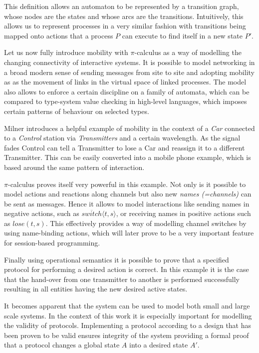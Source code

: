 This definition allows an automaton to be represented by a transition graph, whose nodes are the states and whose arcs are the transitions. Intuitively, this allows us to represent processes in a very similar fashion with transitions being mapped onto actions that a process $P$ can execute to find itself in a new state $P'$.

Let us now fully introduce mobility with $\pi$-calculus as a way of modelling the changing connectivity of interactive systems. It is possible to model networking in a broad modern sense of sending messages from site to site and adopting mobility as as the movement of links in the virtual space of linked processes. The model also allows to enforce a certain discipline on a family of automata, which can be compared to type-system value checking in high-level languages, which imposes certain patterns of behaviour on selected types.

Milner\cite{pi-calculus} introduces a helpful example of mobility in the context of a \textit{Car} connected to a \textit{Control} station via \textit{Transmitters} and a certain wavelength. As the signal fades Control can tell a Transmitter to lose a Car and reassign it to a different Transmitter. This can be easily converted into a mobile phone example, which is based around the same pattern of interaction.

$\pi$-calculus proves itself very powerful in this example. Not only is it possible to model actions and reactions along channels but also new \textit{names (=channels)} can be sent as messages. Hence it allows to model interactions like sending names in negative actions, such as $\overline{switch}\langle t,s \rangle$, or receiving names in positive actions such as $lose(t,s)$. This effectively provides a way of modelling channel switches by using name-binding actions, which will later prove to be a very important feature for session-based programming.

Finally using operational semantics it is possible to prove that a specified protocol for performing a desired action is correct. In this example it is the case that the hand-over from one transmitter to another is performed successfully resulting in all entities having the new desired active states.

It becomes apparent that the system can be used to model both small and large scale systems. In the context of this work it is especially important for modelling the validity of protocols. Implementing a protocol according to a design that has been proven to be valid ensures integrity of the system providing a formal proof that a protocol changes a global state $A$ into a desired state $A'$.

